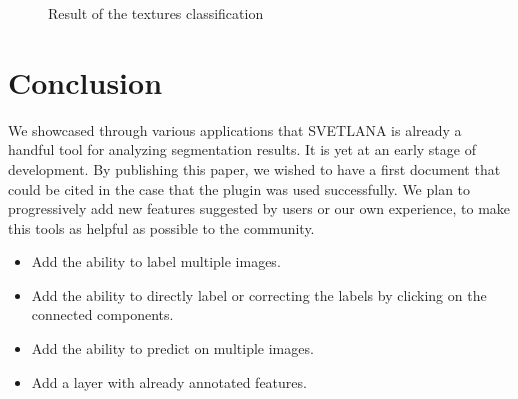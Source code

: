 \documentclass{article}
\begin{document}
\begin{figure}[h!]
\begin{center}
{      \label{textures res}
                         }
     \end{center}
\caption{Result of the textures classification}
\end{figure}



\section{Conclusion}
\label{sec:conclusion}

We showcased through various applications that SVETLANA is already a handful tool for analyzing segmentation results. 
It is yet at an early stage of development. By publishing this paper, we wished to have a first document that could be cited in the case that the plugin was used successfully. We plan to progressively add new features suggested by users or our own experience, to make this tools as helpful as possible to the community. 
\begin{itemize}
  \item Add the ability to label multiple images. 
  \item Add the ability to directly label or correcting the labels by clicking on the connected components. 
  \item Add the ability to predict on multiple images. 
  \item Add a layer with already annotated features.
\end{itemize}
\end{document}
